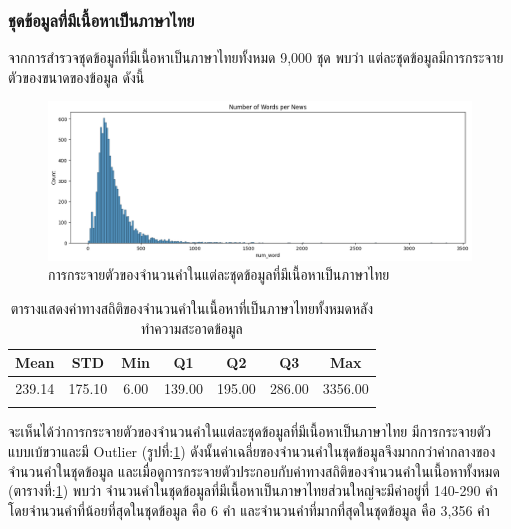 \documentclass[12pt,oneside,openright,a4paper]{cpe-thai-project}
\begin{document}
      \subsubsection{ชุดข้อมูลที่มีเนื้อหาเป็นภาษาไทย}
        \hspace{1cm}จากการสำรวจชุดข้อมูลที่มีเนื้อหาเป็นภาษาไทยทั้งหมด 9,000 ชุด พบว่า แต่ละชุดข้อมูลมีการกระจายตัวของขนาดของข้อมูล \newline ดังนี้
        \begin{figure}[!ht]\centering
          \includegraphics[width=\textwidth]{./img/thai_stat/hist_all_word.png}
          \caption{การกระจายตัวของจำนวนคำในแต่ละชุดข้อมูลที่มีเนื้อหาเป็นภาษาไทย}\label{fig:thai_hist}
        \end{figure}
        \begin{longtable}[!ht]{ccccccc}
          \caption{ตารางแสดงค่าทางสถิติของจำนวนคำในเนื้อหาที่เป็นภาษาไทยทั้งหมดหลังทำความสะอาดข้อมูล}
          \label{tbl:thai_stat_all}\\
          \hhline{=======}
          \textbf{Mean} & \textbf{STD} & \textbf{Min} & \textbf{Q1} & \textbf{Q2} & \textbf{Q3} & \textbf{Max}\\ \hline
          \endhead
          239.14 & 175.10 & 6.00 & 139.00 & 195.00 & 286.00 & 3356.00  \\ \hhline{=======}%
        \end{longtable}
        \hspace{1cm}จะเห็นได้ว่าการกระจายตัวของจำนวนคำในแต่ละชุดข้อมูลที่มีเนื้อหาเป็นภาษาไทย มีการกระจายตัวแบบเบ้ขวาและมี Outlier (รูปที่:\ref{fig:thai_hist}) 
        ดังนั้นค่าเฉลี่ยของจำนวนคำในชุดข้อมูลจึงมากกว่าค่ากลางของจำนวนคำในชุดข้อมูล และเมื่อดูการกระจายตัวประกอบกับค่าทางสถิติของจำนวนคำในเนื้อหาทั้งหมด
        (ตารางที่:\ref{tbl:thai_stat_all}) พบว่า จำนวนคำในชุดข้อมูลที่มีเนื้อหาเป็นภาษาไทยส่วนใหญ่จะมีค่าอยู่ที่ 140-290 คำ โดยจำนวนคำที่น้อยที่สุดในชุดข้อมูล คือ 6 คำ
        และจำนวนคำที่มากที่สุดในชุดข้อมูล คือ 3,356 คำ
        
\end{document}
